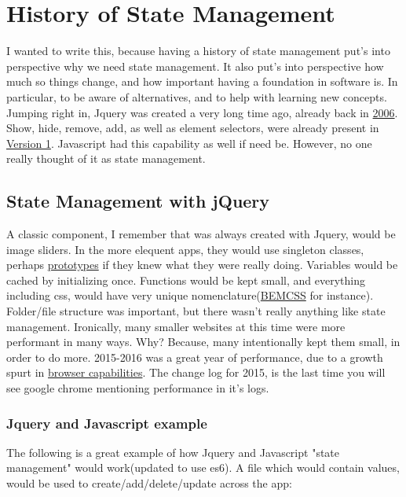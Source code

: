 
\chapter{ History of State Management }

I wanted to write this, because having a history of state management put's into
perspective why we need state management. It also put's into perspective how
much so things change, and how important having a foundation in software is.
In particular, to be aware of alternatives, and to help with learning new
concepts. Jumping right in, Jquery was created a very long time ago, already
back in \href{https://en.wikipedia.org/wiki/JQuery}{2006}. Show, hide, remove,
add, as well as element selectors, were already present in
\href{http://api.jquery.com/category/version/1.0/}{Version 1}. Javascript had
this capability as well if need be. However, no one really thought of it as
state management.

\section{ State Management with jQuery }
A classic component, I remember that was always created with Jquery, would be
image sliders. In the more elequent apps, they would use singleton classes,
perhaps \href{https://www.w3schools.com/js/js\_object\_prototypes.asp}{prototypes}
if they knew what they were really doing. Variables would be cached by
initializing once. Functions would be kept small, and everything including css,
would have very unique nomenclature(\href{http://getbem.com/introduction/}{BEMCSS}
for instance). Folder/file structure was important, but there wasn't really
anything like state management. Ironically, many smaller websites at this time
were more performant in many ways. Why? Because, many intentionally kept them
small, in order to do more. 2015-2016 was a great year of performance, due to a
growth spurt in \href{https://chromereleases.googleblog.com/2015/03/stable-channel-update.html}{browser capabilities}.
The change log for 2015, is the last time you will see google chrome mentioning
performance in it's logs.

\subsection{Jquery and Javascript example}
The following is a great example of how Jquery and Javascript 
"state management" would work(updated to use es6). A file which would
contain values, would be used to create/add/delete/update across the app:

